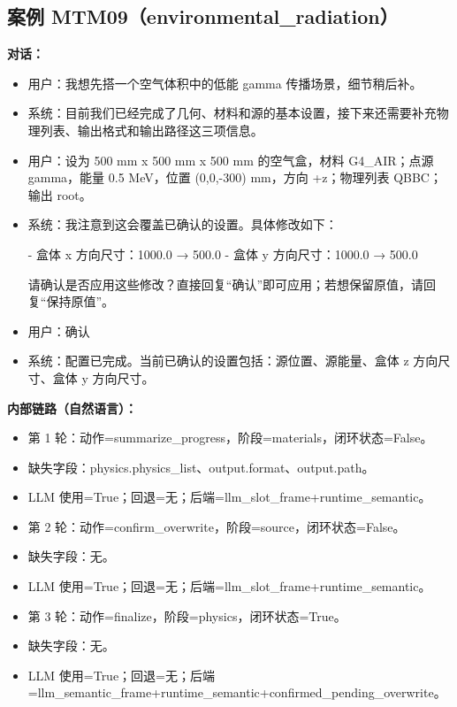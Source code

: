\documentclass[11pt]{ctexart}
\begin{document}
\subsection{案例 MTM09（environmental\_radiation）}
\textbf{对话：}
\begin{itemize}
\item 用户：我想先搭一个空气体积中的低能 gamma 传播场景，细节稍后补。
\item 系统：目前我们已经完成了几何、材料和源的基本设置，接下来还需要补充物理列表、输出格式和输出路径这三项信息。
\item 用户：设为 500 mm x 500 mm x 500 mm 的空气盒，材料 G4\_AIR；点源 gamma，能量 0.5 MeV，位置 (0,0,-300) mm，方向 +z；物理列表 QBBC；输出 root。
\item 系统：我注意到这会覆盖已确认的设置。具体修改如下：

- 盒体 x 方向尺寸：1000.0 → 500.0
- 盒体 y 方向尺寸：1000.0 → 500.0

请确认是否应用这些修改？直接回复“确认”即可应用；若想保留原值，请回复“保持原值”。
\item 用户：确认
\item 系统：配置已完成。当前已确认的设置包括：源位置、源能量、盒体 z 方向尺寸、盒体 y 方向尺寸。
\end{itemize}
\textbf{内部链路（自然语言）：}
\begin{itemize}
\item 第 1 轮：动作=summarize\_progress，阶段=materials，闭环状态=False。
\item 缺失字段：physics.physics\_list、output.format、output.path。
\item LLM 使用=True；回退=无；后端=llm\_slot\_frame+runtime\_semantic。
\item 第 2 轮：动作=confirm\_overwrite，阶段=source，闭环状态=False。
\item 缺失字段：无。
\item LLM 使用=True；回退=无；后端=llm\_slot\_frame+runtime\_semantic。
\item 第 3 轮：动作=finalize，阶段=physics，闭环状态=True。
\item 缺失字段：无。
\item LLM 使用=True；回退=无；后端=llm\_semantic\_frame+runtime\_semantic+confirmed\_pending\_overwrite。
\end{itemize}
\end{document}
